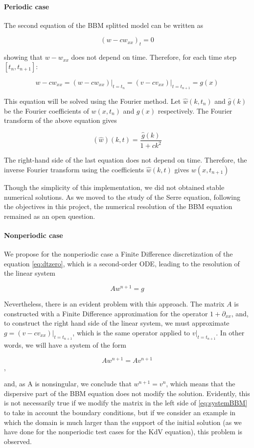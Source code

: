 \paragraph{Periodic case}

\indent The second equation of the BBM splitted model can be written as

$$(w - cw_{xx})_t=0$$

\noindent showing that $w - w_{xx}$ does not depend on time. Therefore, for each time step $[t_n,t_{n+1}] : $

$$ \label{eq:dtzero}w - cw_{xx} = (w - cw_{xx})\rvert_{t=t_n} = (v - cv_{xx})\rvert_{t=t_{n+1}} = g(x)$$

\indent This equation will be solved using the Fourier method. Let $\hat{w}(k,t_n)$ and $\hat{g}(k)$ be the Fourier coefficients of $w(x,t_n)$ and $g(x)$ respectively.  The Fourier transform of the above equation gives

$$(\hat{w})(k,t) = \frac{\hat{g}(k)}{1+ck^2}$$

\indent The right-hand side of the last equation does not depend on time. Therefore, the inverse Fourier transform using the coefficients $\hat{w}(k,t)$ gives $w(x,t_{n+1})$

\indent Though the simplicity of this implementation, we did not obtained stable numerical solutions. As we moved to the study of the Serre equation, following the objectives in this project, the numerical resolution of the BBM equation remained as an open question.

\paragraph{Nonperiodic case}

\indent We propose for the nonperiodic case a Finite Difference discretization of the equation \eqref{eq:dtzero}, which is a second-order ODE, leading to the resolution of the linear system

$$Aw^{n+1} = g$$

\indent Nevertheless, there is an evident problem with this approach. The matrix $A$ is constructed with a Finite Difference approximation for the operator $1 + \partial_{xx}$, and, to construct the right hand side of the linear system, we must approximate  $ g = (v - cv_{xx})\rvert_{t=t_{n+1}} $, which is the same operator applied to $v\rvert_{t=t_{n+1}}$. In other words, we will have a system of the form

$$ \label{eq:systemBBM} Aw^{n+1} = Av^{n+1}$$,

\noindent and, as A is nonsingular, we conclude that $w^{n+1} = v^{n}$, which means that the dispersive part of the BBM equation does not modify the solution. Evidently, this is not necessarily true if we modify the matrix in the left side of \ref{eq:systemBBM} to take in account the boundary conditions, but if we consider an example in which the domain is much larger than the support of the initial solution (as we have done for the nonperiodic test cases for the KdV equation), this problem is observed.
